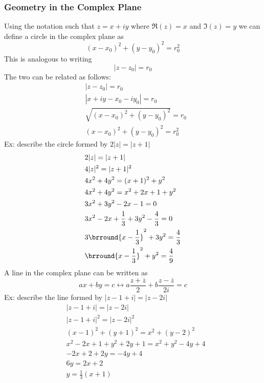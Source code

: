 


\subsubsection{Geometry in the Complex Plane}
Using the notation such that $z=x+iy$ where $\Re(z)=x$ and $\Im(z)=y$ we can define a circle in the complex plane as
\[
(x-x_0)^2+(y-y_0)^2=r_0^2
\]
This is analogous to writing
\[
|z-z_0|=r_0
\]
The two can be related as follows:
\begin{align*}
    &|z-z_0|=r_0\\
    &|x+iy-x_0-iy_0|=r_0\\
    &\sqrt{(x-x_0)^2+(y-y_0)^2}=r_0\\
    &(x-x_0)^2+(y-y_0)^2=r_0^2
\end{align*}
Ex: describe the circle formed by $2|z|=|z+1|$
\begin{align*}
    &2|z|=|z+1|\\
    &4|z|^2=|z+1|^2\\
    &4x^2+4y^2=(x+1)^2+y^2\\
    &4x^2+4y^2=x^2+2x+1+y^2\\
    &3x^2+3y^2-2x-1=0\\
    &3x^2-2x+\frac{1}{3}+3y^2-\frac{4}{3}=0\\
    &3\brround{x-\frac{1}{3}}^2+3y^2=\frac{4}{3}\\
    &\brround{x-\frac{1}{3}}^2+y^2=\frac{4}{9}
\end{align*}
A line in the complex plane can be written as
\[
ax+by=c \longleftrightarrow a\frac{z+\overline{z}}{2}+b\frac{z-\overline{z}}{2i}=c
\]
Ex: describe the line formed by $|z-1+i|=|z-2i|$
\begin{align*}
    &|z-1+i|=|z-2i|\\
    &|z-1+i|^2=|z-2i|^2\\
    &(x-1)^2+(y+1)^2=x^2+(y-2)^2\\
    &x^2-2x+1+y^2+2y+1=x^2+y^2-4y+4\\
    &-2x+2+2y=-4y+4\\
    &6y=2x+2\\
    &y=\frac{1}{3}(x+1)
\end{align*}

